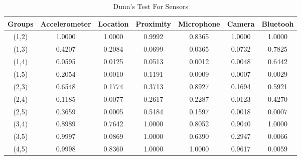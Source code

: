 \begin{table}[h!]
  \centering
  \caption{Dunn's Test For Sensors}
  \label{tab:dunn_sensors}
  \begin{tabular}{ccccccc}
    \toprule
     Groups & Accelerometer & Location & Proximity & Microphone & Camera & Bluetooh \\
    \midrule
    (1,2) & 1.0000 & 1.0000 & 0.9992 & 0.8365 & 1.0000 & 1.0000 \\
    (1,3) & 0.4207 & 0.2084 & 0.0699 & 0.0365 & 0.0732 & 0.7825 \\
    (1,4) & 0.0595 & 0.0125 & 0.0513 & 0.0012 & 0.0048 & 0.6442 \\
    (1,5) & 0.2054 & 0.0010 & 0.1191 & 0.0009 & 0.0007 & 0.0029 \\
    (2,3) & 0.6548 & 0.1774 & 0.3713 & 0.8927 & 0.1694 & 0.5921 \\
    (2,4) & 0.1185 & 0.0077 & 0.2617 & 0.2287 & 0.0123 & 0.4270 \\
    (2,5) & 0.3659 & 0.0005 & 0.5184 & 0.1597 & 0.0018 & 0.0007 \\
    (3,4) & 0.8989 & 0.7642 & 1.0000 & 0.8052 & 0.9040 & 1.0000 \\
    (3,5) & 0.9997 & 0.0869 & 1.0000 & 0.6390 & 0.2947 & 0.0066 \\
    (4,5) & 0.9998 & 0.8360 & 1.0000 & 1.0000 & 0.9617 & 0.0059 \\
    \bottomrule
  \end{tabular}
\end{table} 


